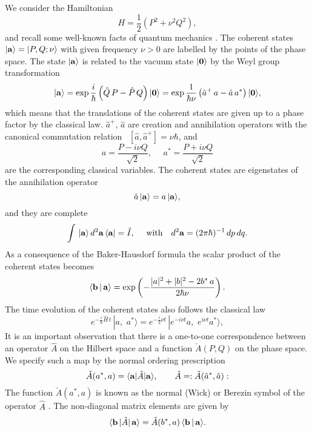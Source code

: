 \documentclass[a4paper,12pt]{article}
\begin{document}
We consider the Hamiltonian
\begin{equation}\label{Hamilton1}
H=\frac{1}{2}\left(P^2 + \nu^2 Q^2 \right),
\end{equation}
and recall some well-known facts of quantum mechanics
\cite{Perelomov}.  The coherent states $|{\bf a}\rangle =
|P,Q; \nu\rangle$ with given frequency $\nu>0$ are labelled by the points
of the phase space.  The state $|{\bf a}\rangle$ is related to the
vacuum state $|\bf {0}\rangle$ by the Weyl group transformation
\begin{equation}\label{Weilgroup}
|{\bf a}\rangle =
\exp\frac{i}{\hbar}\left(\hat Q\, P-\hat P\,Q\right)
 |{\bf {0}}\rangle =
\exp\frac{1}{\hbar\nu}\left(\hat a^+\, a-\hat a\,a^*\right)
 |{\bf {0}}\rangle,
\end{equation}
which means that the translations of the coherent states
 are given up to a phase factor by the classical law.
$\hat a^+$, $\hat a$ are creation and annihilation
operators  with the canonical commutation relation \,
$[\hat a, \hat a^+]=\nu \hbar$, and
\begin{equation}\label{a,a+}
a=\frac{P-i\nu Q}{\sqrt{2}},~~~~~~
a^*=\frac{P+i\nu Q}{\sqrt{2}}
\end{equation}
are the corresponding classical variables.
The coherent states are eigenstates of the annihilation operator
\begin{equation}\label{eigenstate}
\hat a\,|{\bf a}\rangle = a\,|{\bf a}\rangle,
\end{equation}
and they are complete
\begin{equation}\label{I}
\int\, |{\bf a}\rangle\, d^2{\bf a}\, \langle{\bf a}|=\hat I,~~~~
\mbox{with}~~~d^2{\bf a}=(2\pi\hbar)^{-1}\,dp\,dq.
\end{equation}
As a consequence of the Baker-Hausdorf formula the scalar
product of the coherent states becomes
\begin{equation}\label{ba}
\langle {\bf b}\,|\,{\bf a}\rangle =\exp\left (-\frac{|a|^2+|b|^2 -2b^*\,a}
{2\hbar\nu} \right).
\end{equation}
The time evolution of the coherent states also follows the classical law
\begin{equation}\label{cl-law}
e^{-\frac{i}{\hbar}\hat H\,t}\,| a,\,\,a^*\rangle=
e^{-\frac{i}{2}\nu t}\,|e^{-i\nu t} a,
\,\,e^{i\nu t}a^* \rangle,
\end{equation}
It is an important observation that there is a one-to-one correspondence
between an operator  $\hat A$ on the Hilbert space and a
function $\check A(P,Q)$ on the phase space.
We specify such a map by the normal ordering prescription
\begin{equation}\label{symb}
\check A(a^*,a)=\langle {\bf a} |\hat A|{\bf a}\rangle,~~~~~~
\hat A =:\check A(\hat a^*,\hat a):
\end{equation}
The function $\check A(a^*,a)$ is known as the normal (Wick)
or Berezin symbol of the operator $\hat A$ \cite{Berezin}.
The non-diagonal matrix elements are given by
\begin{equation}\label{bAa}
\langle {\bf b}\,|\hat A|\,{\bf a}\rangle = \check A(b^*,a)
\,\langle {\bf b}\,|\,{\bf a}\rangle .
\end{equation}
\end{document}

